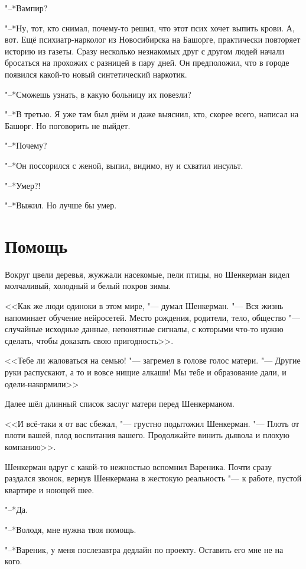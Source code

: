 "--*Вампир?

"--*Ну, тот, кто снимал, почему-то решил, что этот псих хочет выпить крови.
А, вот.
Ещё психиатр-нарколог из Новосибирска на Башорге, практически повторяет историю из газеты.
Сразу несколько незнакомых друг с другом людей начали бросаться на прохожих с разницей в пару дней.
Он предположил, что в городе появился какой-то новый синтетический наркотик.

"--*Сможешь узнать, в какую больницу их повезли?

"--*В третью.
Я уже там был днём и даже выяснил, кто, скорее всего, написал на Башорг.
Но поговорить не выйдет.

"--*Почему?

"--*Он поссорился с женой, выпил, видимо, ну и схватил инсульт.

"--*Умер?!

"--*Выжил.
Но лучше бы умер.

\section{Помощь}

Вокруг цвели деревья, жужжали насекомые, пели птицы, но Шенкерман видел молчаливый, холодный и белый покров зимы.

<<Как же люди одиноки в этом мире, "--- думал Шенкерман.
"--- Вся жизнь напоминает обучение нейросетей.
Место рождения, родители, тело, общество "--- случайные исходные данные, непонятные сигналы, с которыми что-то нужно сделать, чтобы доказать свою пригодность>>.

<<Тебе ли жаловаться на семью! "--- загремел в голове голос матери.
"--- Другие руки распускают, а то и вовсе нищие алкаши!
Мы тебе и образование дали, и одели-накормили\ldotse>>

Далее шёл длинный список заслуг матери перед Шенкерманом.

<<И всё-таки я от вас сбежал, "--- грустно подытожил Шенкерман.
"--- Плоть от плоти вашей, плод воспитания вашего.
Продолжайте винить дьявола и плохую компанию>>.

Шенкерман вдруг с какой-то нежностью вспомнил Вареника.
Почти сразу раздался звонок, вернув Шенкермана в жестокую реальность "--- к работе, пустой квартире и ноющей шее.

"--*Да.

"--*Володя, мне нужна твоя помощь.

"--*Вареник, у меня послезавтра дедлайн по проекту.
Оставить его мне не на кого.

